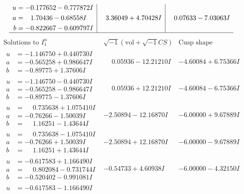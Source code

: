 \documentclass[1p]{elsarticle_modified}
\theoremstyle{definition}
\newcommand{\I}{\sqrt{-1}}
\begin{document}
$$\begin{array}{c|c|c}
\begin{aligned}
u &= -0.177652 - 0.777872 I \\
a &= \phantom{-}1.70436 - 0.68558 I \\
b &= -0.822667 - 0.609797 I\end{aligned}
 & \phantom{-}3.36049 + 4.70428 I & \phantom{-}0.07633 - 7.03063 I\\
 \hline 
 \end{array}$$\newpage$$\begin{array}{c|c|c}  
\text{Solutions to }I^u_{1}& \I (\text{vol} + \sqrt{-1}CS) & \text{Cusp shape}\\
 \hline 
\begin{aligned}
u &= -1.146750 + 0.440730 I \\
a &= -0.565258 + 0.986647 I \\
b &= -0.89775 + 1.37606 I\end{aligned}
 & \phantom{-}0.05936 - 12.21210 I & -4.60084 + 6.75366 I \\ \hline\begin{aligned}
u &= -1.146750 - 0.440730 I \\
a &= -0.565258 - 0.986647 I \\
b &= -0.89775 - 1.37606 I\end{aligned}
 & \phantom{-}0.05936 + 12.21210 I & -4.60084 - 6.75366 I \\ \hline\begin{aligned}
u &= \phantom{-}0.735638 + 1.075410 I \\
a &= -0.76266 - 1.50039 I \\
b &= \phantom{-}1.16251 - 1.43644 I\end{aligned}
 & -2.50894 - 12.16870 I & -6.00000 + 9.67889 I \\ \hline\begin{aligned}
u &= \phantom{-}0.735638 - 1.075410 I \\
a &= -0.76266 + 1.50039 I \\
b &= \phantom{-}1.16251 + 1.43644 I\end{aligned}
 & -2.50894 + 12.16870 I & -6.00000 - 9.67889 I \\ \hline\begin{aligned}
u &= -0.617583 + 1.166490 I \\
a &= \phantom{-}0.802084 - 0.731744 I \\
b &= -0.520402 - 0.991081 I\end{aligned}
 & -0.54733 + 4.60938 I & -6.00000 - 4.32150 I \\ \hline\begin{aligned}
u &= -0.617583 - 1.166490 I \\

\end{aligned}
\end{array}$$
\end{document}

